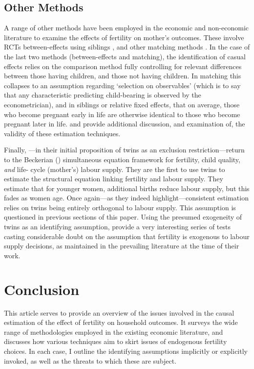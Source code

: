 \documentclass{article}
\begin{document}
\begin{spacing}{1.4}
\subsection{Other Methods}
A range of other methods have been employed in the economic and non-economic
literature to examine the effects of fertility on mother's outcomes. These involve
RCTs \citep{DiCensoetal2002} between-effects using siblings \citep{Holmlund2005,
GeronimusKorenman1992,Ribar1999}, and other matching methods 
\citep{ChevalierViitanen2003,LevinePainter2003}.  In the case of the last two
methods (between-effects and matching), the identification of casual effects
relies on the comparison method fully controlling for relevant differences between
those having children, and those not having children.  In matching this collapses
to an assumption regarding `selection on observables' (which is to say that any
characteristic predicting child-bearing is observed by the econometrician), and in
siblings or relative fixed effects, that on average, those who become pregnant
early in life are otherwise identical to those who become pregnant later in life.
\citet{Ribar1999} and \citet{RosenzweigSchultz1985} provide additional discussion, 
and examination of, the validity of these estimation techniques.

Finally, \citet{RosenzweigWolpin1980b}---in their initial proposition of twins as
an exclusion restriction---return to the Beckerian (\citeyear{BeckerLewis1973})
simultaneous equation framework for fertility, child quality, \emph{and} life-%
cycle (mother's) labour supply.  They are the first to use twins to estimate
the structural equation linking fertility and labour supply.  They estimate
that for younger women, additional births reduce labour supply, but this fades
as women age.  Once again---as they indeed highlight---consistent estimation
relies on twins being entirely orthogonal to labour supply.  This assumption 
is questioned in previous sections of this paper. Using the presumed 
exogeneity of twins as an identifying assumption, \citet{RosenzweigWolpin1980b} 
provide a very interesting series of tests casting considerable doubt on the 
assumption that fertility is exogenous to labour supply decisions, as maintained 
in the prevailing literature at the time of their work.


\section{Conclusion}
This article serves to provide an overview of the issues involved in the causal
estimation of the effect of fertility on household outcomes. It surveys the wide 
range of methodologies employed in the existing economic literature, and
discusses how various techniques aim to skirt issues of endogenous fertility 
choices.  In each case, I outline the identifying assumptions implicitly or
explicitly invoked, as well as the threats to which these are subject.


\end{spacing}
\end{document}
